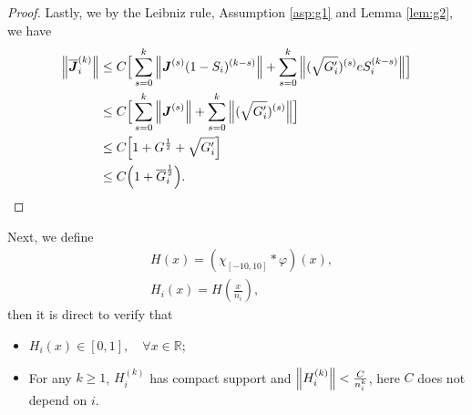 \documentclass[a4paper, 11pt]{article}
\theoremstyle{plain}
\theoremstyle{remark}
\theoremstyle{definition}
\renewcommand{\H}{H}
\newcommand{\J}{\boldsymbol{J}}
\begin{document}
\begin{proof}
			Lastly, we by the Leibniz rule, Assumption \ref{asp:g1} and Lemma \ref{lem:g2}, we have 
			\begin{equation}
				\begin{aligned}
					\norm{\overline{\J}_i^{(k)}}&\leq C\Big[\sum_{s=0}^k\norm{{\J}^{(s)}(1-S_i)^{(k-s)}}+\sum_{s=0}^k\norm{(\sqrt{G_i'})^{(s)}eS_i^{(k-s)}}\Big]\\
					&\leq C\Big[\sum_{s=0}^k\norm{{\J}^{(s)}}+\sum_{s=0}^k\norm{(\sqrt{G_i'})^{(s)}}\Big]\\
					&\leq C\Big[1+G^{\frac{1}{2}}+\sqrt{G_i'}\Big]\\
					&\leq C\Big(1+\overline{G}_i^{\frac{1}{2}}\Big).
				\end{aligned}
			\end{equation}
			
		\end{proof}	
		Next, we define 
		\begin{equation}
			\begin{aligned}
				&\H(x)=(\chi_{[-10,10]}*\varphi)(x),\\
				&\H_i(x)=\H(\frac{x}{n_i}),
			\end{aligned}
		\end{equation}
		then it is direct to verify that 
		\begin{itemize}
			\item ${\H_i(x)}\in [0,1],\quad\forall x\in \mathbb{R}$;
			\item  For any $k\geq 1$, $\H_i^{(k)}$ has compact support and $\norm{\H^{(k)}_i}<\frac{C}{n_i^k}$, here $C$ does not depend on $i$.
		\end{itemize}
		
\end{document}
